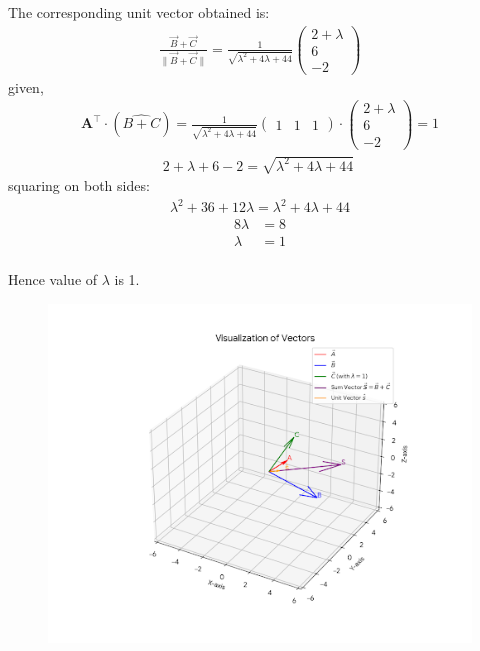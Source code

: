 \documentclass[journal]{IEEEtran}
\begin{document}
The corresponding unit vector obtained is:
\begin{align}
\frac{\vec{B} + \vec{C}}{\|\vec{B} + \vec{C}\|} =
\frac{1}{\sqrt{\lambda^2 + 4\lambda + 44}} \begin{pmatrix} 2+\lambda \\ 6 \\ -2 \end{pmatrix} 
\end{align}
given,
\begin{align}
 \mathbf{A^\top} \cdot (\hat{B+C}) = 
\frac{1}{\sqrt{\lambda^2 + 4\lambda + 44}} \begin{pmatrix}1 & 1 & 1 \end{pmatrix} \cdot \begin{pmatrix} 2+\lambda \\ 6 \\ -2 \end{pmatrix}=1
\end{align}
\begin{align}
2 + \lambda + 6 - 2 = \sqrt{\lambda^2 + 4\lambda + 44} \
\end{align}
squaring on both sides:
\begin{align}\lambda^2 + 36 + 12\lambda = \lambda^2 + 4\lambda + 44  
\end{align}
\begin{align}8\lambda &= 8 \\\lambda &= 1\end{align}\\
Hence value of $\lambda$ is 1.


\begin{figure}[H]
    \centering
    \includegraphics[width=0.8\linewidth]{figs/graph-1.png}
    \caption{}
    \label{fig:placeholder}
\end{figure}
\end{document}
